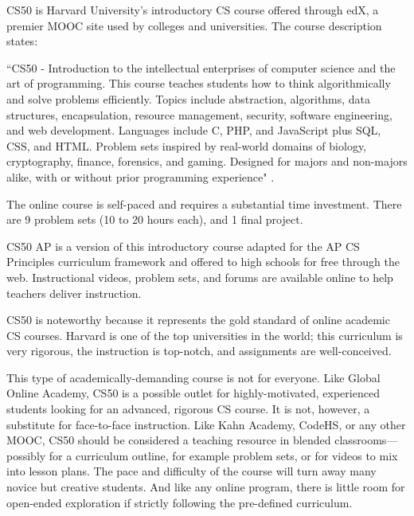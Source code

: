 CS50 is Harvard University's introductory CS course offered through edX, a premier MOOC site used by colleges and universities. The course description states:
\begin{blockquote}``CS50 - Introduction to the intellectual enterprises of computer science and the art of programming. This course teaches students how to think algorithmically and solve problems efficiently. Topics include abstraction, algorithms, data structures, encapsulation, resource management, security, software engineering, and web development. Languages include C, PHP, and JavaScript plus SQL, CSS, and HTML. Problem sets inspired by real-world domains of biology, cryptography, finance, forensics, and gaming. Designed for majors and non-majors alike, with or without prior programming experience" \cite{cs50}.
\end{blockquote}
The online course is self-paced and requires a substantial time investment. There are 9 problem sets (10 to 20 hours each), and 1 final project. \par
CS50 AP is a version of this introductory course adapted for the AP CS Principles curriculum framework and offered to high schools for free through the web. Instructional videos, problem sets, and forums are available online to help teachers deliver instruction.\par
CS50 is noteworthy because it represents the gold standard of online academic CS courses. Harvard is one of the top universities in the world; this curriculum is very rigorous, the instruction is top-notch, and assignments are well-conceived. \par
This type of academically-demanding course is not for everyone. Like Global Online Academy, CS50 is a possible outlet for highly-motivated, experienced students looking for an advanced, rigorous CS course. It is not, however, a substitute for face-to-face instruction. Like Kahn Academy, CodeHS, or any other MOOC, CS50 should be considered a teaching resource in blended classrooms---possibly for a curriculum outline, for example problem sets, or for videos to mix into lesson plans. The pace and difficulty of the course will turn away many novice but creative students. And like any online program, there is little room for open-ended exploration if strictly following the pre-defined curriculum.\par


